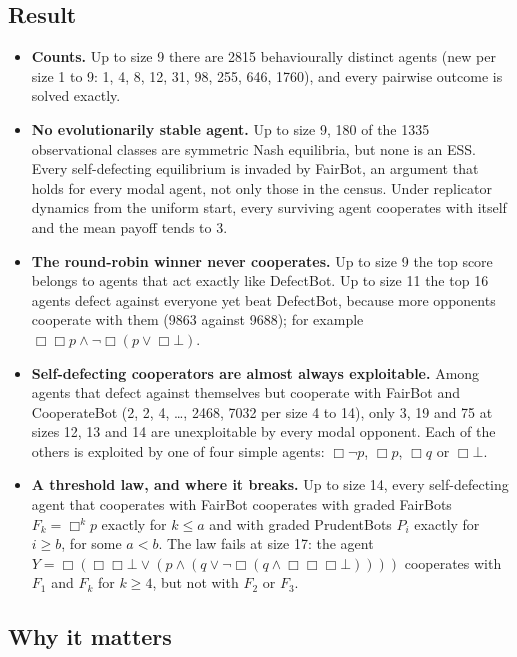\documentclass{article}
\begin{document}
\subsection*{Result}

\begin{itemize}
\item \textbf{Counts.} Up to size 9 there are 2815 behaviourally distinct agents (new per size 1 to 9: 1, 4, 8, 12, 31, 98, 255, 646, 1760), and every pairwise outcome is solved exactly.
\item \textbf{No evolutionarily stable agent.} Up to size 9, 180 of the 1335 observational classes are symmetric Nash equilibria, but none is an ESS. Every self-defecting equilibrium is invaded by FairBot, an argument that holds for every modal agent, not only those in the census. Under replicator dynamics from the uniform start, every surviving agent cooperates with itself and the mean payoff tends to 3.
\item \textbf{The round-robin winner never cooperates.} Up to size 9 the top score belongs to agents that act exactly like DefectBot. Up to size 11 the top 16 agents defect against everyone yet beat DefectBot, because more opponents cooperate with them (9863 against 9688); for example $\Box\Box p \wedge \neg\Box(p \vee \Box\bot)$.
\item \textbf{Self-defecting cooperators are almost always exploitable.} Among agents that defect against themselves but cooperate with FairBot and CooperateBot (2, 2, 4, \ldots{}, 2468, 7032 per size 4 to 14), only 3, 19 and 75 at sizes 12, 13 and 14 are unexploitable by every modal opponent. Each of the others is exploited by one of four simple agents: $\Box\neg p$, $\Box p$, $\Box q$ or $\Box\bot$.
\item \textbf{A threshold law, and where it breaks.} Up to size 14, every self-defecting agent that cooperates with FairBot cooperates with graded FairBots $F_k = \Box^k p$ exactly for $k \le a$ and with graded PrudentBots $P_i$ exactly for $i \ge b$, for some $a < b$. The law fails at size 17: the agent $Y = \Box(\Box\Box\bot \vee (p \wedge (q \vee \neg\Box(q \wedge \Box\Box\Box\bot))))$ cooperates with $F_1$ and $F_k$ for $k \ge 4$, but not with $F_2$ or $F_3$.
\end{itemize}

\subsection*{Why it matters}
\end{document}
